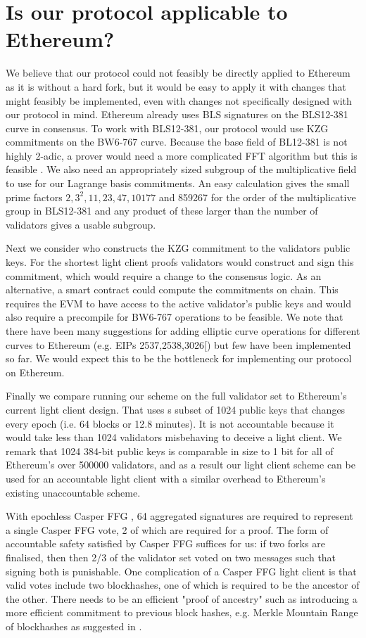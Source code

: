 \section{Is our protocol applicable to Ethereum?} \label{sec:ethereum}

We believe that our protocol could not feasibly be directly applied to Ethereum as it is without a hard fork, but it would be easy to apply it with changes that might feasibly be implemented, even with changes not specifically designed with our protocol in mind.
 Ethereum already uses BLS signatures on the BLS12-381 curve in consensus. To work with BLS12-381, our protocol would use KZG commitments on the BW6-767 curve\cite{bw6767}.
 Because the base field of BL12-381 is not highly 2-adic, a prover would need a more complicated FFT algorithm but this is feasible \cite{bw6767}. We also need an appropriately sized subgroup of the multiplicative field to use for our Lagrange basis commitments. An easy calculation gives the small prime factors $2,3^2,11,23,47,10177$ and 859267 for the order of the multiplicative group in BLS12-381 and any product of these larger than the number of validators gives a usable subgroup.
 
 Next we consider who constructs the KZG commitment to the validators public keys. For the shortest light client proofs validators would construct and sign this commitment, which would require a change to the consensus logic. As an alternative, a smart contract could compute the commitments on chain.
 This requires the EVM to have access to the active validator's public keys and would also require a precompile for BW6-767 operations to be feasible.
 We note that there have been many suggestions for adding elliptic curve operations for different curves to Ethereum (e.g. EIPs 2537,2538,3026[\cite{EIPs}) but few have been implemented so far.
 We would expect this to be the bottleneck for implementing our protocol on Ethereum.
 
 Finally we compare running our scheme on the full validator set to Ethereum's current light client design\cite{ethlight}.
 That uses s subset of 1024 public keys that changes every epoch (i.e. 64 blocks or 12.8 minutes). It is not accountable because it would take less than 1024 validators misbehaving to deceive a light client. We remark that 1024 384-bit public keys is comparable in size to 1 bit for all of Ethereum's over 500000 validators, and as a result our light client scheme can be used for an accountable light client with a similar overhead to Ethereum's existing unaccountable scheme.

 With epochless Casper FFG \cite{Gasper}, 64 aggregated signatures are required to represent a single Casper FFG vote, 2 of which are required for a proof. The form of accountable safety satisfied by Casper FFG \cite{CasperFFG} suffices for us: if two forks are finalised, then then 2/3 of the validator set voted on two messages such that signing both is punishable.  One complication of a Casper FFG light client is that valid votes include two blockhashes, one of which is required to be the ancestor of the other. There needs to be an efficient "proof of ancestry" such as introducing a more efficient commitment to previous block hashes, e.g. Merkle Mountain Range of blockhashes as suggested in \cite{flyclient}.
